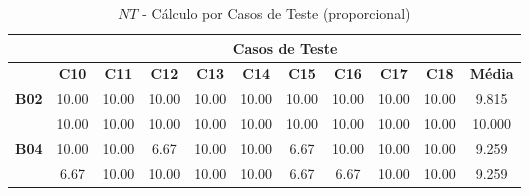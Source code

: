 \begin{table}[htbp]
	\centering
	\caption{$NT$ - Cálculo por Casos de Teste (proporcional)}
	\begin{tabular}{c|cccccccccc|}
		\cline{2-11}
		\rowcolor[HTML]{D0CECE} 
		\cellcolor[HTML]{F2F2F2}\textbf{} & \multicolumn{10}{c|}{\cellcolor[HTML]{D0CECE}\textbf{Casos de Teste}} \\ \hline
		\rowcolor[HTML]{D9D9D9} 
		\multicolumn{1}{|c|}{\cellcolor[HTML]{D0CECE}\textbf{Part.}} & \multicolumn{1}{c|}{\cellcolor[HTML]{D9D9D9}\textbf{C10}} & \multicolumn{1}{c|}{\cellcolor[HTML]{D9D9D9}\textbf{C11}} & \multicolumn{1}{c|}{\cellcolor[HTML]{D9D9D9}\textbf{C12}} & \multicolumn{1}{c|}{\cellcolor[HTML]{D9D9D9}\textbf{C13}} & \multicolumn{1}{c|}{\cellcolor[HTML]{D9D9D9}\textbf{C14}} & \multicolumn{1}{c|}{\cellcolor[HTML]{D9D9D9}\textbf{C15}} & \multicolumn{1}{c|}{\cellcolor[HTML]{D9D9D9}\textbf{C16}} & \multicolumn{1}{c|}{\cellcolor[HTML]{D9D9D9}\textbf{C17}} & \multicolumn{1}{c|}{\cellcolor[HTML]{D9D9D9}\textbf{C18}} & \textbf{Média} \\ \hline
		\multicolumn{1}{|c|}{\textbf{B02}} & \multicolumn{1}{c|}{10.00} & \multicolumn{1}{c|}{10.00} & \multicolumn{1}{c|}{10.00} & \multicolumn{1}{c|}{10.00} & \multicolumn{1}{c|}{10.00} & \multicolumn{1}{c|}{10.00} & \multicolumn{1}{c|}{10.00} & \multicolumn{1}{c|}{10.00} & \multicolumn{1}{c|}{10.00} & 9.815 \\ \hline
		\rowcolor[HTML]{F2F2F2} 
		\multicolumn{1}{|c|}{\cellcolor[HTML]{F2F2F2}\textbf{B03}} & \multicolumn{1}{c|}{\cellcolor[HTML]{F2F2F2}10.00} & \multicolumn{1}{c|}{\cellcolor[HTML]{F2F2F2}10.00} & \multicolumn{1}{c|}{\cellcolor[HTML]{F2F2F2}10.00} & \multicolumn{1}{c|}{\cellcolor[HTML]{F2F2F2}10.00} & \multicolumn{1}{c|}{\cellcolor[HTML]{F2F2F2}10.00} & \multicolumn{1}{c|}{\cellcolor[HTML]{F2F2F2}10.00} & \multicolumn{1}{c|}{\cellcolor[HTML]{F2F2F2}10.00} & \multicolumn{1}{c|}{\cellcolor[HTML]{F2F2F2}10.00} & \multicolumn{1}{c|}{\cellcolor[HTML]{F2F2F2}10.00} & 10.000 \\ \hline
		\multicolumn{1}{|c|}{\textbf{B04}} & \multicolumn{1}{c|}{10.00} & \multicolumn{1}{c|}{10.00} & \multicolumn{1}{c|}{6.67} & \multicolumn{1}{c|}{10.00} & \multicolumn{1}{c|}{10.00} & \multicolumn{1}{c|}{6.67} & \multicolumn{1}{c|}{10.00} & \multicolumn{1}{c|}{10.00} & \multicolumn{1}{c|}{10.00} & 9.259 \\ \hline
		\rowcolor[HTML]{F2F2F2} 
		\multicolumn{1}{|c|}{\cellcolor[HTML]{F2F2F2}\textbf{B05}} & \multicolumn{1}{c|}{\cellcolor[HTML]{F2F2F2}6.67} & \multicolumn{1}{c|}{\cellcolor[HTML]{F2F2F2}10.00} & \multicolumn{1}{c|}{\cellcolor[HTML]{F2F2F2}10.00} & \multicolumn{1}{c|}{\cellcolor[HTML]{F2F2F2}10.00} & \multicolumn{1}{c|}{\cellcolor[HTML]{F2F2F2}10.00} & \multicolumn{1}{c|}{\cellcolor[HTML]{F2F2F2}6.67} & \multicolumn{1}{c|}{\cellcolor[HTML]{F2F2F2}6.67} & \multicolumn{1}{c|}{\cellcolor[HTML]{F2F2F2}10.00} & \multicolumn{1}{c|}{\cellcolor[HTML]{F2F2F2}10.00} & 9.259 \\ \hline

\end{tabular}
\end{table}

